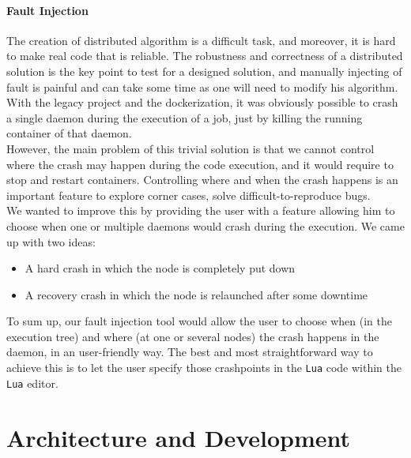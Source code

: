 \documentclass{eplmastersthesis}
\begin{document}
        \subsubsection{Fault Injection}

          The creation of distributed algorithm is a difficult task, and
          moreover, it is hard to make real code that is reliable. The robustness
          and correctness of a distributed solution is the key point to test
          for a designed solution, and manually injecting of fault is painful
          and can take some time as one will need to modify his algorithm.\\

          With the legacy project and the dockerization, it was obviously
          possible to crash a single daemon during the execution of a job, just
          by killing the running container of that daemon.\\
          However, the main problem of this trivial solution is that we cannot
          control where the crash may happen during the code execution, and
          it would require to stop and restart containers. Controlling where
          and when the crash happens is an important feature to explore
          corner cases, solve difficult-to-reproduce bugs.\\
          We wanted to improve this by providing the user with a feature
          allowing him to choose when one or multiple daemons would crash during
          the execution. We came up with two ideas:

          \begin{itemize}
            \item A hard crash in which the node is completely put down
            \item A recovery crash in which the node is relaunched after some
            downtime
          \end{itemize}

          To sum up, our fault injection tool would allow the user to choose
          when (in the execution tree) and where (at one or several nodes) the
          crash happens in the daemon, in an user-friendly way. The best and
          most straightforward way to achieve this is to let
          the user specify those crashpoints in the \texttt{Lua} code within the \texttt{Lua}
          editor.

  \chapter{Architecture and Development}
  \label{chap:dev}
\end{document}
